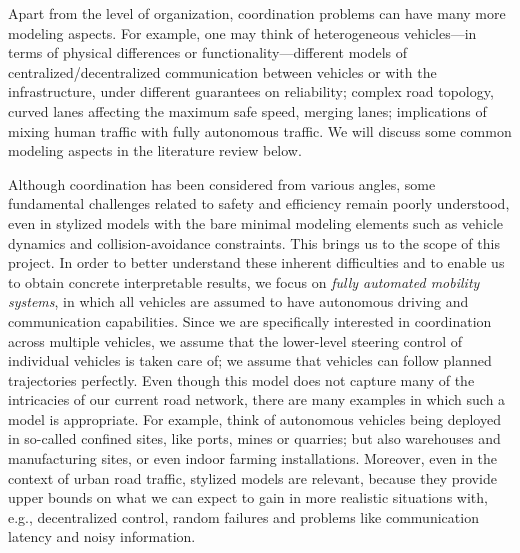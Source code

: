 \documentclass[a4paper]{report}
\theoremstyle{definition}
\theoremstyle{plain}
\begin{document}
%
Apart from the level of organization, coordination problems can have many more
modeling aspects. For example, one may think of heterogeneous vehicles---in
terms of physical differences or functionality---different models of
centralized/decentralized communication between vehicles or with the
infrastructure, under different guarantees on reliability; complex road
topology, curved lanes affecting the maximum safe speed, merging lanes;
implications of mixing human traffic with fully autonomous traffic.
%
We will discuss some common modeling aspects in the literature review below.

%
Although coordination has been considered from various angles, some fundamental
challenges related to safety and efficiency remain poorly understood, even in
stylized models with the bare minimal modeling elements such as vehicle dynamics
and collision-avoidance constraints.
%
This brings us to the scope of this project.
%
%
In order to better understand these inherent difficulties and to enable us to
obtain concrete interpretable results, we focus on \emph{fully automated
  mobility systems}, in which all vehicles are assumed to have autonomous driving
and communication capabilities.
%
Since we are specifically interested in coordination across multiple vehicles,
we assume that the lower-level steering control of individual vehicles is taken
care of; we assume that vehicles can follow planned trajectories perfectly.
%
%
Even though this model does not capture many of the intricacies of our current
road network, there are many examples in which such a model is appropriate. For
example, think of autonomous vehicles being deployed in so-called confined
sites, like ports, mines or quarries; but also warehouses and manufacturing
sites, or even indoor farming installations.
%
%
Moreover, even in the context of urban road traffic, stylized models are
relevant, because they provide upper bounds on what we can expect to gain in
more realistic situations with, e.g., decentralized control, random failures and
problems like communication latency and noisy information.
\end{document}
